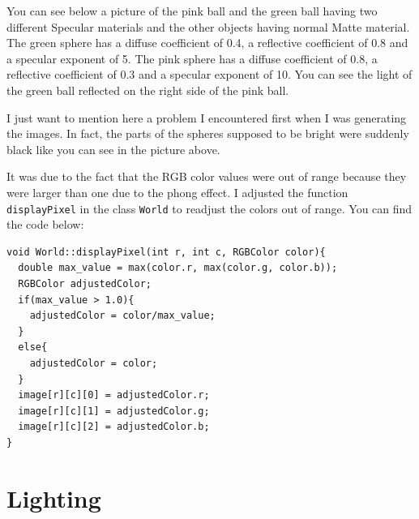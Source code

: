 \documentclass[a4paper,11.5pt]{article}
\theoremstyle{mytheor}
\begin{document}
You can see below a picture of the pink ball and the green ball having two different Specular materials and the other objects having normal Matte material. The green sphere has a diffuse coefficient of 0.4, a reflective coefficient of 0.8 and a specular exponent of 5. The pink sphere has a diffuse coefficient of 0.8, a reflective coefficient of 0.3 and a specular exponent of 10. You can see the light of the green ball reflected on the right side of the pink ball. 
\begin{figure}[H]
\centering
{}
\end{figure} 
I just want to mention here a problem I encountered first when I was generating the images. In fact, the parts of the spheres supposed to be bright were suddenly black like you can see in the picture above.
\begin{figure}[H]
\centering
{}
\end{figure}
It was due to the fact that the RGB color values were out of range because they were larger than one due to the phong effect. I adjusted the function \texttt{displayPixel} in the class \texttt{World} to readjust the colors out of range. You can find the code below:
\begin{lstlisting}
void World::displayPixel(int r, int c, RGBColor color){
  double max_value = max(color.r, max(color.g, color.b));
  RGBColor adjustedColor;
  if(max_value > 1.0){
    adjustedColor = color/max_value;
  }
  else{
    adjustedColor = color;
  }
  image[r][c][0] = adjustedColor.r;
  image[r][c][1] = adjustedColor.g;
  image[r][c][2] = adjustedColor.b;
}
\end{lstlisting} 
\section{Lighting}
\end{document}
